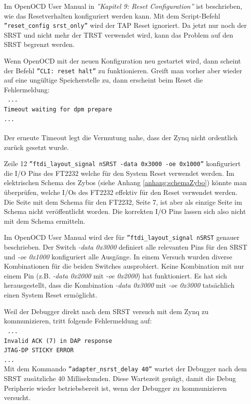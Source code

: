 Im OpenOCD User Manual\cite{bib:OpenOCDDoku} in \textit{''Kapitel 9: Reset Configuration''} ist beschrieben, wie das Resetverhalten konfiguriert werden kann.
Mit dem Script-Befehl \texttt{''reset\_config srst\_only''} wird der TAP Reset ignoriert.
Da jetzt nur noch der SRST und nicht mehr der TRST verwendet wird, kann das Problem auf den SRST begrenzt werden.

Wenn OpenOCD mit der neuen Konfiguration neu gestartet wird, dann scheint der Befehl \texttt{''CLI: reset halt''} zu funktionieren.
Greift man vorher aber wieder auf eine ungültige Speicherstelle zu, dann erscheint beim Reset die Fehlermeldung:\\
\texttt{
...\\
Timeout waiting for dpm prepare\\
...\\
}\\
Der erneute Timeout legt die Vermutung nahe, dass der Zynq nicht ordentlich zurück gesetzt wurde.

Zeile 12 \texttt{''ftdi\_layout\_signal nSRST -data 0x3000 -oe 0x1000''} konfiguriert die I/O Pins des FT2232 welche für den System Reset verwendet werden.
Im elektrischen Schema des Zybos (siehe Anhang \ref{anhang:schemaZybo}) könnte man überprüfen, welche I/Os des FT2232 effektiv für den Reset verwendet werden.
Die Seite mit dem Schema für den FT2232, Seite 7, ist aber als einzige Seite im Schema nicht veröffentlicht worden.
Die korrekten I/O Pins lassen sich also nicht mit dem Schema ermitteln.

Im OpenOCD User Manual\cite{bib:OpenOCDDoku} wird der für \texttt{''ftdi\_layout\_signal nSRST} genauer beschrieben.
Der Switch \textit{-data 0x3000} definiert alle relevanten Pins für den SRST und \textit{-oe 0x1000} konfiguriert alle Ausgänge.
In einem Versuch wurden diverse Kombinationen für die beiden Switches ausprobiert.
Keine Kombination mit nur einem Pin (z.B. \textit{-data 0x2000} mit \textit{-oe 0x2000}) hat funktioniert.
Es hat sich herausgestellt, dass die Kombination \textit{-data 0x3000} mit \textit{-oe 0x3000} tatsächlich einen System Reset ermöglicht.

Weil der Debugger direkt nach dem SRST versuch mit dem Zynq zu kommunizieren, tritt folgende Fehlermeldung auf:\\
\texttt{
...\\
Invalid ACK (7) in DAP response\\
JTAG-DP STICKY ERROR\\
...\\
}
Mit dem Kommando \texttt{''adapter\_nsrst\_delay 40''} wartet der Debugger nach dem SRST zusätzliche 40 Millisekunden.
Diese Wartezeit genügt, damit die Debug Peripherie wieder betriebsbereit ist, wenn der Debugger zu kommunizieren versucht.



